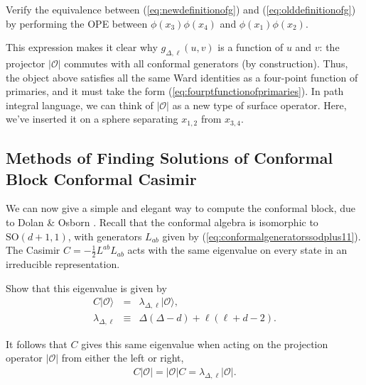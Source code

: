 \documentclass[12pt]{article}
\numberwithin{equation}{section}
\newcommand\be{\begin{eqnarray}}
\newcommand\ee{\end{eqnarray}}
\newcommand\f\phi
\newcommand\cO{\mathcal{O}}
\newcommand\<\langle
\renewcommand\>\rangle
\newcommand\nn{\nonumber}
\renewcommand\.{\cdot}
\newcommand\SO{\mathrm{SO}}
\newcommand\De{\Delta}
\renewcommand\l\lambda
\begin{document}
Verify the equivalence between (\ref{eq:newdefinitionofg}) and (\ref{eq:olddefinitionofg}) by performing the OPE between $\f(x_3)\f(x_4)$ and $\f(x_1)\f(x_2)$.


This expression makes it clear why $g_{\De,\ell}(u,v)$ is a function of $u$ and $v$: the projector $|\cO|$ commutes with all conformal generators (by construction).  Thus, the object above satisfies all the same Ward identities as a four-point function of primaries, and it must take the form (\ref{eq:fourptfunctionofprimaries}).  In path integral language, we can think of $|\cO|$ as a new type of  surface operator.  Here, we've inserted it on a sphere separating $x_{1,2}$ from $x_{3,4}$.

\subsection{Methods of Finding Solutions of Conformal Block Conformal Casimir}

We can now give a simple and elegant way to compute the conformal block, due to Dolan \& Osborn \cite{DO2}.
Recall that the conformal algebra is isomorphic to $\SO(d+1,1)$, with generators $L_{ab}$ given by (\ref{eq:conformalgeneratorssodplus11}).  The Casimir $C=-\frac 1 2 L^{ab}L_{ab}$ acts with the same eigenvalue on every state in an irreducible representation.  

Show that this eigenvalue is given by
\be
C|\cO\> &=& \l_{\De,\ell}|\cO\>,\nn\\
\l_{\De,\ell} &\equiv& \De(\De-d)+\ell(\ell+d-2).
\ee

It follows that $C$ gives this same eigenvalue when acting on the projection operator $|\cO|$ from either the left or right,
\be
C|\cO|=|\cO| C = \l_{\De,\ell}|\cO|.
\ee
\end{document}
